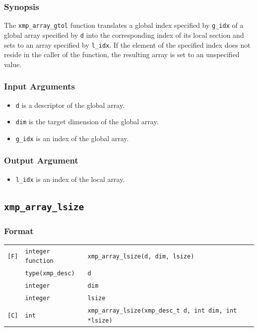 \subsubsection*{Synopsis}

The {\tt xmp\_array\_gtol} function translates a global index specified by {\tt g\_idx} of a global array specified by {\tt d} into the corresponding index of its local section and sets to an array specified by {\tt l\_idx}. 
If the element of the specified index does not reside in the caller of the function, 
the resulting array is set to an unspecified value.

\subsubsection*{Input Arguments}

\begin{itemize}
 \item {\tt d} is a descriptor of the global array.
 \item {\tt dim} is the target dimension of the global array.
 \item {\tt g\_idx} is an index of the global array.
\end{itemize}

\subsubsection*{Output Argument}

\begin{itemize}
 \item {\tt l\_idx} is an index of the local array.
\end{itemize}

\subsection{\tt xmp\_array\_lsize}

\subsubsection*{Format}

\begin{tabular}{lll}

\verb![F]!& {\tt integer function}& {\tt xmp\_array\_lsize(d, dim, lsize)}\\
          & {\tt type(xmp\_desc)} & {\tt d}\\
          & {\tt integer} & {\tt dim}\\
          & {\tt integer} & {\tt lsize}\\

\verb![C]!&  {\tt int}& {\tt xmp\_array\_lsize(xmp\_desc\_t d, int dim, int *lsize)}\\

\end{tabular}

